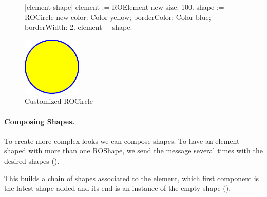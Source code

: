 \documentclass[a4paper,10pt,twoside]{book}
\begin{document}
\begin{figure}[H]
      \begin{minipage}[t]{0.5\textwidth}
      \vspace{0pt}
     \begin{code}
     
|element shape|
element := ROElement new 
				size: 100.
shape := ROCircle new 
			color: Color yellow; 
			borderColor: Color blue; 
			borderWidth: 2.
element + shape.	\end{code}
   \end{minipage}
   \hfill
   \begin{minipage}[t]{0.4\textwidth}
      \vspace{0pt} \raggedright
       \centering
		\includegraphics[width=0.25\textwidth]{circle}     
   \end{minipage}
\caption{Customized ROCircle}
\label{fig:circle}
\end{figure}



\paragraph{Composing Shapes.}
To create more complex looks we can compose shapes. To have an element shaped with more than one ROShape, we send the \ct{+} message several times with the desired shapes (). 

This builds a chain of shapes associated to the element, which first component is the latest shape added and its end is an instance of the empty shape ().
\end{document}
